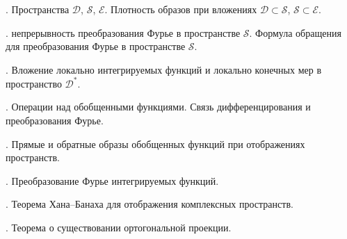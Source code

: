 \documentclass[10pt,titlepage, a4paper]{article}
\begin{document}
. Пространства $\mathcal{D}$, $\mathcal{S}$,
$\mathcal{E}$. Плотность образов при вложениях $\mathcal{D}\subset
\mathcal{S}$, $\mathcal{S}\subset\mathcal{E}$.

. непрерывность преобразования Фурье в пространстве
$\mathcal{S}$. Формула обращения для преобразования Фурье в
пространстве $\mathcal{S}$.

. Вложение локально интегрируемых функций и локально
конечных мер в пространство $\mathcal{D}^*$.

. Операции над обобщенными функциями. Связь
дифференцирования и преобразования Фурье.

. Прямые и обратные образы обобщенных функций при
отображениях пространств.

. Преобразование Фурье интегрируемых функций.

. Теорема Хана--Банаха для отображения комплексных
пространств.

. Теорема о существовании ортогональной проекции.
\end{document}

